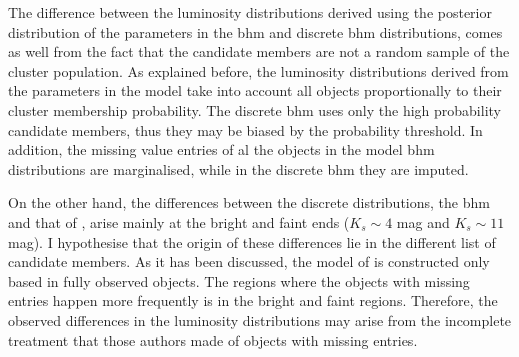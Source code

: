 The difference between the luminosity distributions derived using the posterior distribution of the parameters in the \gls{bhm} and discrete \gls{bhm} distributions, comes as well from the fact that the candidate members are not a random sample of the cluster population. As explained before, the luminosity distributions derived from the parameters in the model take into account all objects proportionally to their cluster membership probability. The discrete \gls{bhm} uses only the high probability candidate members, thus they may be biased by the probability threshold. In addition, the missing value entries of al the objects in the model \gls{bhm} distributions are marginalised, while in the discrete \gls{bhm} they are imputed.
 
On the other hand, the differences between the discrete distributions, the \gls{bhm} and that of \citet{Bouy2015}, arise mainly at the bright and faint ends ($K_s\sim 4$ mag and $K_s\sim11$ mag). I hypothesise that the origin of these differences lie in the different list of candidate members. As it has been discussed, the model of \citet{Bouy2015} is constructed only based in fully observed objects. The regions where the objects with missing entries happen more frequently is in the bright and faint regions. Therefore, the observed differences in the luminosity distributions may arise from the incomplete treatment that those authors made of objects with missing entries.

